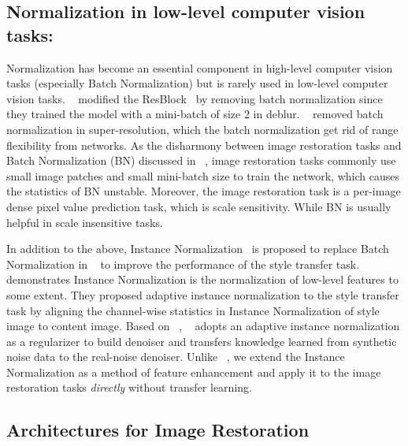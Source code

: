 \documentclass[final]{cvpr}
\begin{document}
\subsection{Normalization in low-level computer vision tasks:}
Normalization has become an essential component in high-level computer vision tasks (especially Batch Normalization) but is rarely used in low-level computer vision tasks. ~\cite{nah2017deep} modified the ResBlock~\cite{he2016deep} by removing batch normalization since they trained the model with a mini-batch of size 2 in deblur. ~\cite{lim2017enhanced} removed batch normalization in super-resolution, which the batch normalization get rid of range flexibility from networks.  As the disharmony between image restoration tasks and Batch Normalization (BN) discussed in ~\cite{yu2018wide}, image restoration tasks commonly use small image patches and small mini-batch size to train the network, which causes the statistics of BN unstable. Moreover, the image restoration task is a per-image dense pixel value prediction task, which is scale sensitivity. While BN is usually helpful in scale insensitive tasks. 


In addition to the above, Instance Normalization~\cite{ulyanov2016instance} is proposed to replace Batch Normalization in ~\cite{ulyanov2016texture} to improve the performance of the style transfer task. ~\cite{huang2017arbitrary} demonstrates Instance Normalization is the normalization of low-level features to some extent. They proposed adaptive instance normalization to the style transfer task by aligning the channel-wise statistics in Instance Normalization of style image to content image. Based on ~\cite{huang2017arbitrary}, ~\cite{kim2020transfer} adopts an adaptive instance normalization as a regularizer to build denoiser and transfers knowledge learned from synthetic noise data to the real-noise denoiser.
Unlike ~\cite{kim2020transfer}, we extend the Instance Normalization as a method of feature enhancement and apply it to the image restoration tasks \emph{directly} without transfer learning. 

\subsection{Architectures for Image Restoration }
\end{document}
